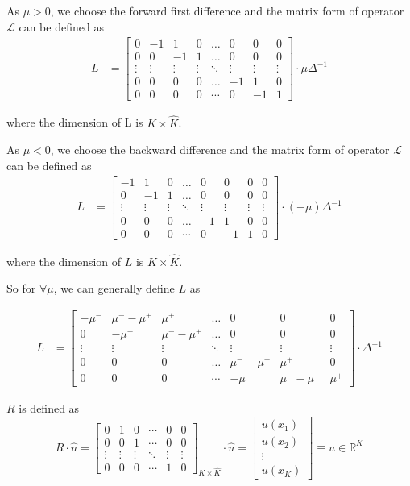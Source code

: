 \documentclass[11pt]{article}
\newcommand{\R}{\ensuremath{\mathbb{R}}}
\begin{document}
As $\mu>0$, we choose the forward first difference and the matrix form of operator $\mathcal{L}$ can be defined as
\begin{align}
L &= \begin{bmatrix}
0&-1&1&0&\dots&0&0&0\\
0&0&-1&1&\dots&0&0&0\\
\vdots&\vdots&\vdots&\vdots&\ddots&\vdots&\vdots&\vdots\\
0&0&0&0&\dots&-1&1&0\\
0&0&0&0&\cdots&0&-1&1
\end{bmatrix}\cdot\mu\Delta^{-1}\nonumber
\end{align}

where the dimension of L is $K\times\hat{K}$.

As $\mu<0$, we choose the backward difference and the matrix form of operator $\mathcal{L}$ can be defined as
\begin{align}
L &= \begin{bmatrix}
-1&1&0&\dots&0&0&0&0\\
0&-1&1&\dots&0&0&0&0\\
\vdots&\vdots&\vdots&\ddots&\vdots&\vdots&\vdots&\vdots\\
0&0&0&\dots&-1&1&0&0\\
0&0&0&\cdots&0&-1&1&0
\end{bmatrix}\cdot (-\mu)\Delta^{-1}\nonumber
\end{align}

where the dimension of $L$ is $K\times\hat{K}$.

So for $\forall\mu$, we can generally define $L$ as

\begin{align}
L &= \begin{bmatrix}
-\mu^-&\mu^--\mu^+&\mu^+&\dots&0&0&0\\
0&-\mu^-&\mu^--\mu^+&\dots&0&0&0\\
\vdots&\vdots&\vdots&\ddots&\vdots&\vdots&\vdots\\
0&0&0&\dots&\mu^--\mu^+&\mu^+&0\\
0&0&0&\cdots&-\mu^-&\mu^--\mu^+&\mu^+
\end{bmatrix}\cdot \Delta^{-1}\nonumber
\end{align}

$R$ is defined as 
\begin{equation}
R\cdot \hat{u} =\begin{bmatrix}
0&1&0&\cdots&0&0\\
0&0&1&\cdots&0&0\\
\vdots&\vdots&\vdots&\ddots&\vdots&\vdots\\
0&0&0&\cdots&1&0
\end{bmatrix}_{K\times\hat{K}}\cdot \hat{u}		 
=\begin{bmatrix}
u(x_1)\\
u(x_2)\\
\vdots\\
u(x_K)
\end{bmatrix} \equiv u\in \R^{K} 
\end{equation}
\end{document}
